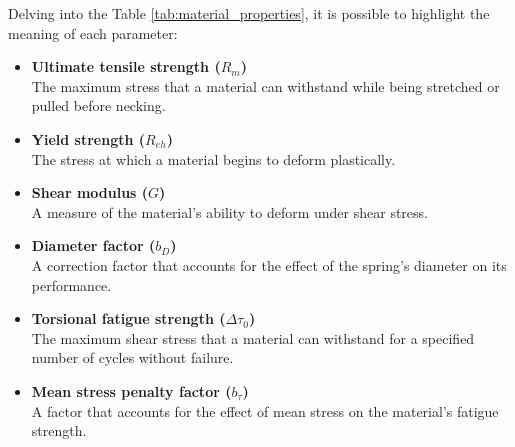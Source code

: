 \documentclass[11pt]{article}
\begin{document}
\begin{table}[H]
    \centering
    \caption{Material properties used in the analysis}
    \label{tab:material_properties}
\end{table}

\noindent
Delving into the Table \ref{tab:material_properties}, it is possible to highlight the meaning of each parameter:
\begin{itemize}
    \item \textbf{Ultimate tensile strength (\( R_m \))} \\ The maximum stress that a material can withstand while being stretched or pulled before necking.
    \item \textbf{Yield strength (\( R_{eh} \))} \\ The stress at which a material begins to deform plastically.
    \item \textbf{Shear modulus (\( G \))} \\ A measure of the material's ability to deform under shear stress.
    \item \textbf{Diameter factor (\( b_D \))} \\ A correction factor that accounts for the effect of the spring's diameter on its performance.
    \item \textbf{Torsional fatigue strength (\( \Delta \tau_0 \))} \\ The maximum shear stress that a material can withstand for a specified number of cycles without failure.
    \item \textbf{Mean stress penalty factor (\( b_\tau \))} \\ A factor that accounts for the effect of mean stress on the material's fatigue strength.
\end{itemize}
\end{document}
